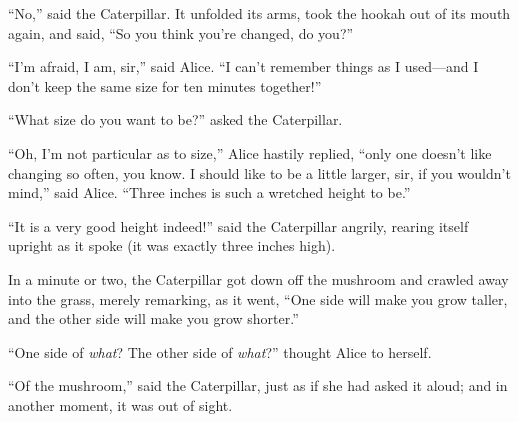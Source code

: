 \begin{compactenum}
\item ``No,'' said the Caterpillar. It unfolded its arms, took the hookah out of its mouth again, and said, ``So you think you're changed, do you?''
\item ``I'm afraid, I am, sir,'' said Alice. ``I can't remember things as I used---and I don't keep the same size for ten minutes together!''
\item ``What size do you want to be?'' asked the Caterpillar.
\item ``Oh, I'm not particular as to size,'' Alice hastily replied, ``only one doesn't like changing so often, you know. I should like to be a little larger, sir, if you wouldn't mind,'' said Alice. ``Three inches is such a wretched height to be.''
\item ``It is a very good height indeed!'' said the Caterpillar angrily, rearing itself upright as it spoke (it was exactly three inches high).
\item In a minute or two, the Caterpillar got down off the mushroom and crawled away into the grass, merely remarking, as it went, ``One side will make you grow taller, and the other side will make you grow shorter.''
\item ``One side of \emph{what}? The other side of \emph{what}?'' thought Alice to herself.
\item ``Of the mushroom,'' said the Caterpillar, just as if she had asked it aloud; and in another moment, it was out of sight.
\end{compactenum}
